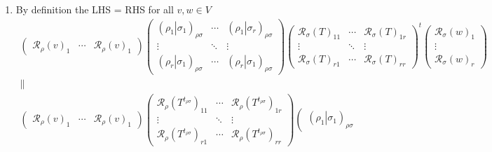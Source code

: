 \documentclass[aps,preprint]{revtex4}
\begin{document}
\begin{enumerate}
\item By definition the LHS = RHS for all $v,w\in V$\ 
\begin{gather}
\left( 
\begin{array}{ccc}
\mathcal{R}_{\rho }\left( v\right) _{1} & \cdots & \mathcal{R}_{\rho }\left(
v\right) _{1}%
\end{array}%
\right) \left( 
\begin{array}{ccc}
\left( \left. \rho _{1}\right\vert \sigma _{1}\right) _{\rho \sigma } & 
\cdots & \left( \left. \rho _{1}\right\vert \sigma _{r}\right) _{\rho \sigma
} \\ 
\vdots & \ddots & \vdots \\ 
\left( \left. \rho _{r}\right\vert \sigma _{1}\right) _{\rho \sigma } & 
\cdots & \left( \left. \rho _{r}\right\vert \sigma _{1}\right) _{\rho \sigma
}%
\end{array}%
\right) \left( 
\begin{array}{ccc}
\mathcal{R}_{\sigma }\left( T\right) _{11} & \cdots & \mathcal{R}_{\sigma
}\left( T\right) _{1r} \\ 
\vdots & \ddots & \vdots \\ 
\mathcal{R}_{\sigma }\left( T\right) _{r1} & \cdots & \mathcal{R}_{\sigma
}\left( T\right) _{rr}%
\end{array}%
\right) ^{t}\left( 
\begin{array}{c}
\mathcal{R}_{\sigma }\left( w\right) _{1} \\ 
\vdots \\ 
\mathcal{R}_{\sigma }\left( w\right) _{r}%
\end{array}%
\right) \\
\parallel \\
\left( 
\begin{array}{ccc}
\mathcal{R}_{\rho }\left( v\right) _{1} & \cdots & \mathcal{R}_{\rho }\left(
v\right) _{1}%
\end{array}%
\right) \left( 
\begin{array}{ccc}
\mathcal{R}_{\rho }\left( T^{t_{\rho \sigma }}\right) _{11} & \cdots & 
\mathcal{R}_{\rho }\left( T^{t_{\rho \sigma }}\right) _{1r} \\ 
\vdots & \ddots & \vdots \\ 
\mathcal{R}_{\rho }\left( T^{t_{\rho \sigma }}\right) _{r1} & \cdots & 
\mathcal{R}_{\rho }\left( T^{t_{\rho \sigma }}\right) _{rr}%
\end{array}%
\right) \left( 
\begin{array}{ccc}
\left( \left. \rho _{1}\right\vert \sigma _{1}\right) _{\rho \sigma } & 

\end{array}
\end{gather}
\end{enumerate}
\end{document}

